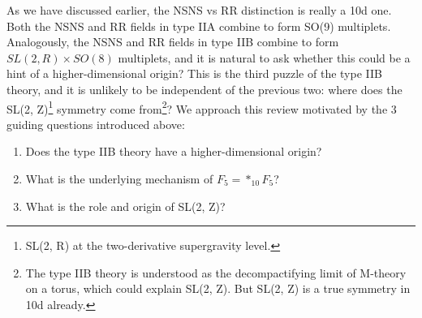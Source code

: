 As we have discussed earlier, the NSNS vs RR distinction is really a 10d one.
Both the NSNS and RR fields in type IIA combine to form SO(9) multiplets.
Analogously, the NSNS and RR fields in type IIB combine to form $SL(2, R)\times SO(8)$ multiplets, and it is natural to ask whether this could be a hint of a higher-dimensional origin?
This is the third puzzle of the type IIB theory, and it is unlikely to be independent of the previous two: where does the SL(2, Z)\footnote{
SL(2, R) at the two-derivative supergravity level.
} symmetry come from\footnote{
The type IIB theory is understood as the decompactifying limit of M-theory on a torus, which could explain SL(2, Z). But SL(2, Z) is a true symmetry in 10d already.}?
We approach this review motivated by the 3 guiding questions introduced above:
\begin{enumerate}
    \item Does the type IIB theory have a higher-dimensional origin?
    \item What is the underlying mechanism of $F_5 = *_{10}F_5$?
    \item What is the role and origin of SL(2, Z)?
\end{enumerate}